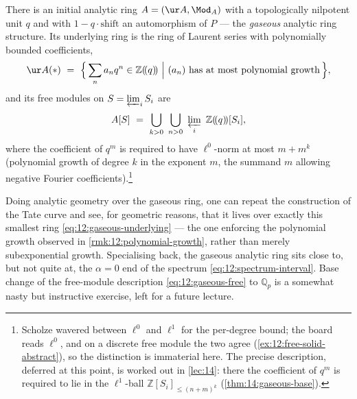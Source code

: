 \begin{theorem}
\label{thm:12:gaseous}
There is an initial analytic ring $A=(\ur A,\Mod_A)$ with a topologically
nilpotent unit $q$ and with $1-q\cdot\mathrm{shift}$ an automorphism of $P$ ---
the \emph{gaseous} analytic ring structure. Its underlying ring is the ring of
Laurent series with polynomially bounded coefficients,
\begin{equation}
\label{eq:12:gaseous-underlying}
\ur A(\ast)\ =\ \Bigl\{\,\sum_n a_n q^{n}\in\mathbb{Z}(\!(q)\!)\ \Big|\
(a_n)\ \text{has at most polynomial growth}\,\Bigr\},
\end{equation}
and its free modules on $S=\varprojlim_i S_i$ are
\begin{equation}
\label{eq:12:gaseous-free}
A[S]\ =\ \bigcup_{k>0}\ \bigcup_{n>0}\ \varprojlim_i\ \mathbb{Z}(\!(q)\!)[S_i],
\end{equation}
where the coefficient of $q^{m}$ is required to have $\ell^{0}$-norm at most
$m+m^{k}$ (polynomial growth of degree $k$ in the exponent $m$, the summand $m$
allowing negative Fourier coefficients).\footnote{Scholze wavered between
$\ell^{0}$ and $\ell^{1}$ for the per-degree bound; the board reads $\ell^{0}$,
and on a discrete free module the two agree (\cref{ex:12:free-solid-abstract}),
so the distinction is immaterial here. The precise description, deferred at this
point, is worked out in \cref{lec:14}: there the coefficient of $q^{m}$ is
required to lie in the $\ell^{1}$-ball $\mathbb{Z}[S_i]_{\le(n+m)^{k}}$
(\cref{thm:14:gaseous-base}).}
\end{theorem}

\begin{remark}
\label{rmk:12:tate-over-gaseous}
Doing analytic geometry over the gaseous ring, one can repeat the construction of
the Tate curve and see, for geometric reasons, that it lives over exactly this
smallest ring \eqref{eq:12:gaseous-underlying} --- the one enforcing the
polynomial growth observed in \cref{rmk:12:polynomial-growth}, rather than merely
subexponential growth. Specialising back, the gaseous analytic ring sits close
to, but not quite at, the $\alpha=0$ end of the spectrum
\eqref{eq:12:spectrum-interval}. Base change of the free-module description
\eqref{eq:12:gaseous-free} to $\mathbb{Q}_p$ is a somewhat nasty but instructive
exercise, left for a future lecture.
\end{remark}
